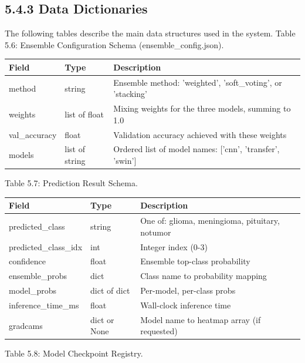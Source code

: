 \documentclass[12pt,a4paper,oneside]{report}
\begin{document}
\subsection{5.4.3 Data Dictionaries}
The following tables describe the main data structures used in the system.
Table 5.6: Ensemble Configuration Schema (ensemble\_config.json).
\begin{center}
\small
\begin{tabularx}{\textwidth}{YYY}
\toprule
\textbf{Field} & \textbf{Type} & \textbf{Description} \\
\midrule
method & string & Ensemble method: 'weighted', 'soft\_voting', or 'stacking' \\
weights & list of float & Mixing weights for the three models, summing to 1.0 \\
val\_accuracy & float & Validation accuracy achieved with these weights \\
models & list of string & Ordered list of model names: ['cnn', 'transfer', 'swin'] \\
\bottomrule
\end{tabularx}
\end{center}
Table 5.7: Prediction Result Schema.
\begin{center}
\small
\begin{tabularx}{\textwidth}{YYY}
\toprule
\textbf{Field} & \textbf{Type} & \textbf{Description} \\
\midrule
predicted\_class & string & One of: glioma, meningioma, pituitary, notumor \\
predicted\_class\_idx & int & Integer index (0-3) \\
confidence & float & Ensemble top-class probability \\
ensemble\_probs & dict & Class name to probability mapping \\
model\_probs & dict of dict & Per-model, per-class probs \\
inference\_time\_ms & float & Wall-clock inference time \\
gradcams & dict or None & Model name to heatmap array (if requested) \\
\bottomrule
\end{tabularx}
\end{center}
Table 5.8: Model Checkpoint Registry.
\end{document}
